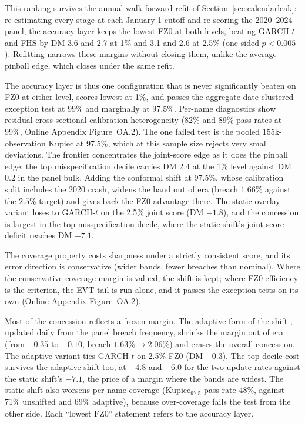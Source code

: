 \documentclass[11pt]{article}
\theoremstyle{remark}
\begin{document}
This ranking survives the annual walk-forward refit of Section~\ref{sec:calendarleak}: re-estimating every stage at each January-1 cutoff and re-scoring the 2020--2024 panel, the accuracy layer keeps the lowest FZ0 at both levels, beating GARCH-$t$ and FHS by DM 3.6 and 2.7 at 1\% and 3.1 and 2.6 at 2.5\% (one-sided $p<0.005$). Refitting narrows these margins without closing them, unlike the average pinball edge, which closes under the same refit.

The accuracy layer is thus one configuration that is never significantly beaten on FZ0 at either level, scores lowest at 1\%, and passes the aggregate date-clustered exception test at 99\% and marginally at 97.5\%. Per-name diagnostics show residual cross-sectional calibration heterogeneity (82\% and 89\% pass rates at 99\%, Online Appendix Figure~OA.2). The one failed test is the pooled 155k-observation Kupiec at 97.5\%, which at this sample size rejects very small deviations. The frontier concentrates the joint-score
edge as it does the pinball edge: the top misspecification decile
carries DM 2.4 at the 1\% level against DM 0.2 in the panel bulk.
Adding the conformal shift at 97.5\%, whose calibration split includes
the 2020 crash, widens the band out of era (breach $1.66\%$ against the $2.5\%$ target) and gives back the FZ0 advantage there. The static-overlay variant loses to GARCH-$t$ on the 2.5\% joint score (DM $-1.8$), and the concession is largest in the top misspecification decile, where the static shift's joint-score deficit reaches DM $-7.1$.

The coverage
property costs sharpness under
a strictly consistent score, and its error direction is conservative
(wider bands, fewer breaches than nominal). Where the conservative
coverage margin is valued, the shift is kept; where FZ0 efficiency is
the criterion, the EVT tail is run alone, and it passes the exception
tests on its own (Online Appendix Figure~OA.2).

Most of the concession reflects a frozen margin. The adaptive form of the shift \citep{gibbs2021aci}, updated daily from the panel breach frequency, shrinks the margin out of era (from $-0.35$ to $-0.10$, breach $1.63\%\to2.06\%$) and erases the overall concession. The adaptive variant ties GARCH-$t$ on 2.5\% FZ0 (DM $-0.3$). The top-decile cost survives the adaptive shift too, at $-4.8$ and $-6.0$ for the two update rates against the static shift's $-7.1$, the price of a margin where the bands are widest. The static shift also worsens per-name coverage (Kupiec$_{97.5}$ pass rate 48\%, against 71\% unshifted and 69\% adaptive), because over-coverage fails the test from the other side. Each ``lowest FZ0'' statement refers to the accuracy layer.
\end{document}
